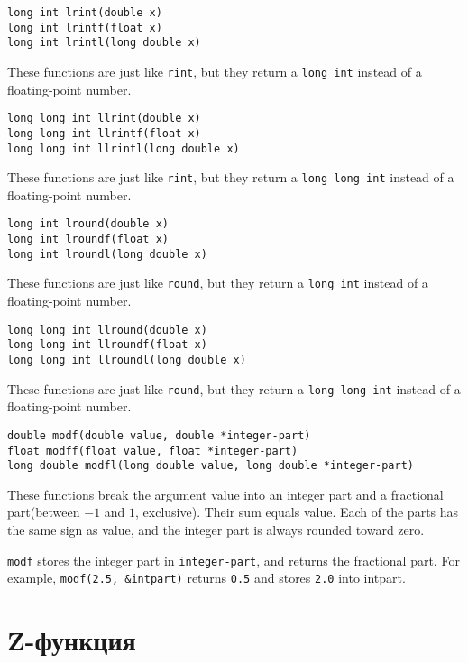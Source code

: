 \documentclass[12pt, titlepage]{article}
\renewcommand{\tt}[1]{\texttt{\small #1}}
\begin{document}
\begin{verbatim}
long int lrint(double x)
long int lrintf(float x)
long int lrintl(long double x)
\end{verbatim}
These functions are just like \tt{rint}, but they return a \tt{long int} instead of a floating-point number.

\begin{verbatim}
long long int llrint(double x)
long long int llrintf(float x)
long long int llrintl(long double x)
\end{verbatim}
These functions are just like \tt{rint}, but they return a \tt{long long int} instead of a floating-point number.

\begin{verbatim}
long int lround(double x)
long int lroundf(float x)
long int lroundl(long double x)
\end{verbatim}
These functions are just like \tt{round}, but they return a \tt{long int} instead of a floating-point number.

\begin{verbatim}
long long int llround(double x)
long long int llroundf(float x)
long long int llroundl(long double x)
\end{verbatim}
These functions are just like \tt{round}, but they return a \tt{long long int} instead of a floating-point number.

\begin{verbatim}
double modf(double value, double *integer-part)
float modff(float value, float *integer-part)
long double modfl(long double value, long double *integer-part)
\end{verbatim}
These functions break the argument value into an integer part and a fractional part(between $-1$ and $1$, exclusive). Their sum equals value. Each of the parts has the same sign as value, and the integer part is always rounded toward zero.

\tt{modf} stores the integer part in \tt{*integer-part}, and returns the fractional part. For example, \tt{modf(2.5, \&intpart)} returns \tt{0.5} and stores \tt{2.0} into intpart.


\section{Z-функция}
\end{document}
